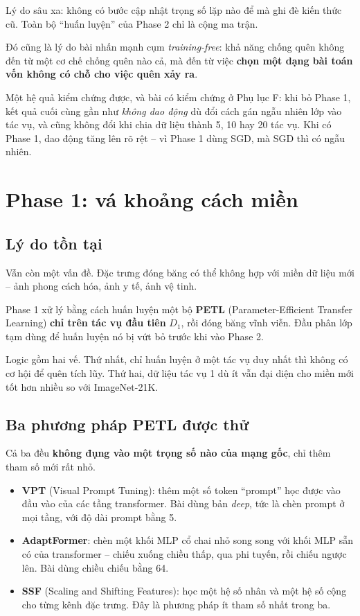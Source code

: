 \documentclass[11pt,a4paper]{article}
\begin{document}
Lý do sâu xa: không có bước cập nhật trọng số lặp nào để mà ghi đè kiến thức cũ.
Toàn bộ ``huấn luyện'' của Phase 2 chỉ là cộng ma trận.

Đó cũng là lý do bài nhấn mạnh cụm \emph{training-free}: khả năng chống quên
không đến từ một cơ chế chống quên nào cả, mà đến từ việc \textbf{chọn một dạng
bài toán vốn không có chỗ cho việc quên xảy ra}.

Một hệ quả kiểm chứng được, và bài có kiểm chứng ở Phụ lục F: khi bỏ Phase 1, kết
quả cuối cùng gần như \emph{không dao động} dù đổi cách gán ngẫu nhiên lớp vào
tác vụ, và cũng không đổi khi chia dữ liệu thành 5, 10 hay 20 tác vụ. Khi có
Phase 1, dao động tăng lên rõ rệt -- vì Phase 1 dùng SGD, mà SGD thì có ngẫu
nhiên.

\section{Phase 1: vá khoảng cách miền}

\subsection{Lý do tồn tại}

Vẫn còn một vấn đề. Đặc trưng đóng băng có thể không hợp với miền dữ liệu mới --
ảnh phong cách hóa, ảnh y tế, ảnh vệ tinh.

Phase 1 xử lý bằng cách huấn luyện một bộ \textbf{PETL} (Parameter-Efficient
Transfer Learning) \textbf{chỉ trên tác vụ đầu tiên} $D_1$, rồi đóng băng vĩnh
viễn. Đầu phân lớp tạm dùng để huấn luyện nó bị vứt bỏ trước khi vào Phase 2.

Logic gồm hai vế. Thứ nhất, chỉ huấn luyện ở một tác vụ duy nhất thì không có cơ
hội để quên tích lũy. Thứ hai, dữ liệu tác vụ 1 dù ít vẫn đại diện cho miền mới
tốt hơn nhiều so với ImageNet-21K.

\subsection{Ba phương pháp PETL được thử}

Cả ba đều \textbf{không đụng vào một trọng số nào của mạng gốc}, chỉ thêm tham số
mới rất nhỏ.

\begin{itemize}[leftmargin=*]
\item \textbf{VPT} (Visual Prompt Tuning): thêm một số token ``prompt'' học được
      vào đầu vào của các tầng transformer. Bài dùng bản \emph{deep}, tức là chèn
      prompt ở mọi tầng, với độ dài prompt bằng 5.
\item \textbf{AdaptFormer}: chèn một khối MLP cổ chai nhỏ song song với khối MLP
      sẵn có của transformer -- chiếu xuống chiều thấp, qua phi tuyến, rồi chiếu
      ngược lên. Bài dùng chiều chiếu bằng 64.
\item \textbf{SSF} (Scaling and Shifting Features): học một hệ số nhân và một hệ
      số cộng cho từng kênh đặc trưng. Đây là phương pháp ít tham số nhất trong
      ba.
\end{itemize}
\end{document}
